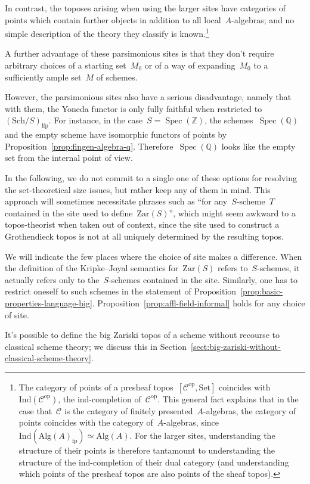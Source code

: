 \documentclass[10pt,reqno,a4paper]{amsbook}
\theoremstyle{definition}
\theoremstyle{plain}
\theoremstyle{remark}
\newcommand{\ZZ}{\mathbb{Z}}
\newcommand{\C}{\mathcal{C}}
\newcommand{\QQ}{\mathbb{Q}}
\newcommand{\Ind}{\mathrm{Ind}}
\newcommand{\Set}{\mathrm{Set}}
\newcommand{\Zar}{\mathrm{Zar}}
\newcommand{\Sch}{\mathrm{Sch}}
\newcommand{\Alg}{\mathrm{Alg}}
\newcommand{\lfp}{\mathrm{lfp}}
\newcommand{\fp}{\mathrm{fp}}
\DeclareMathOperator{\Spec}{Spec}
\newcommand{\op}{\mathrm{op}}
\newcommand{\?}{\,{:}\,}
\renewcommand{\_}{\mathpunct{.}\,}
\begin{document}
{In contrast, the toposes arising when using the larger sites have categories of
points which contain further objects in addition to all local~$A$-algebras; and
no simple description of the theory they classify is known.\footnote{The
category of points of a presheaf topos~$[\C^\op,\Set]$ coincides
with~$\Ind(\C^\op)$, the ind-completion of~$\C^\op$. This general fact explains that
in the case that~$\C$ is the category of finitely presented~$A$-algebras,
the category of points coincides with the category of~$A$-algebras,
since~$\Ind(\Alg(A)_\fp) \simeq \Alg(A)$. For the larger sites, understanding
the structure of their points is therefore tantamount to understanding the
structure of the ind-completion of their dual category (and understanding which
points of the presheaf topos are also points of the sheaf topos).}

A further advantage of these parsimonious sites is that they don't require arbitrary
choices of a starting set~$M_0$ or of a way of expanding~$M_0$ to a sufficiently
ample set~$M$ of schemes.

However, the parsimonious sites also have a serious disadvantage, namely that
with them, the Yoneda functor is only fully faithful when restricted
to~$(\Sch/S)_\lfp$. For instance, in the case~$S = \Spec(\ZZ)$, the
schemes~$\Spec(\QQ)$ and the empty scheme have isomorphic functors of points by Proposition~\ref{prop:fingen-algebra-q}.
Therefore~$\Spec(\QQ)$ looks like the empty set from the internal point of
view.

In the following, we do not commit to a single one of these options for
resolving the set-theoretical size issues, but rather keep any of them
in mind. This approach will sometimes necessitate phrases such as ``for
any~$S$-scheme~$T$ contained in the site used to define~$\Zar(S)$'', which might
seem awkward to a topos-theorist when taken out of context, since
the site used to construct a Grothendieck topos is not at all uniquely
determined by the resulting topos.

We will indicate the few places where the choice of site makes a difference.
When the definition of the Kripke--Joyal semantics for~$\Zar(S)$ refers
to~$S$-schemes, it actually refers only to the~$S$-schemes contained in the
site. Similarly, one has to restrict oneself to such schemes in the statement
of Proposition~\ref{prop:basic-properties-language-big}.
Proposition~\ref{prop:affl-field-informal} holds for any choice of site.

It's possible to define the big Zariski topos of a scheme without recourse to
classical scheme theory; we discuss this in
Section~\ref{sect:big-zariski-without-classical-scheme-theory}.

}
\end{document}
